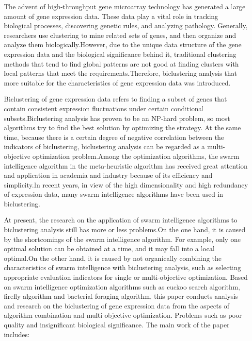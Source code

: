 \begin{eabstract}
  The advent of high-throughput gene microarray technology has generated a large amount of gene expression data. These data play a vital role in tracking biological processes, discovering genetic rules, and analyzing pathology. Generally, researchers use clustering to mine related sets of genes, and then organize and analyze them biologically.However, due to the unique data structure of the gene expression data and the biological significance behind it, traditional clustering methods that tend to find global patterns are not good at finding clusters with local patterns that meet the requirements.Therefore, biclustering analysis that more suitable for the characteristics of gene expression data was introduced.
  
  Biclustering of gene expression data refers to finding a subset of genes that contain consistent expression fluctuations under certain conditional subsets.Biclustering analysis has proven to be an NP-hard problem, so most algorithms try to find the best solution by optimizing the strategy. At the same time, because there is a certain degree of negative correlation between the indicators of biclustering, biclustering analysis can be regarded as a multi-objective optimization problem.Among the optimization algorithms, the swarm intelligence algorithm in the meta-heuristic algorithm has received great attention and application in academia and industry because of its efficiency and simplicity.In recent years, in view of the high dimensionality and high redundancy of expression data, many swarm intelligence algorithms have been used in biclustering.

  At present, the research on the application of swarm intelligence algorithms to biclustering analysis still has more or less problems.On the one hand, it is caused by the shortcomings of the swarm intelligence algorithm. For example, only one optimal solution can be obtained at a time, and it may fall into a local optimal.On the other hand, it is caused by not organically combining the characteristics of swarm intelligence with biclustering analysis, such as selecting appropriate evaluation indicators for single or multi-objective optimization. Based on swarm intelligence optimization algorithms such as cuckoo search algorithm, firefly algorithm and bacterial foraging algorithm, this paper conducts analysis and research on the biclustering of gene expression data from the aspects of algorithm combination and multi-objective optimization. Problems such as poor quality and insignificant biological significance. The main work of the paper includes:
  

\end{eabstract}
